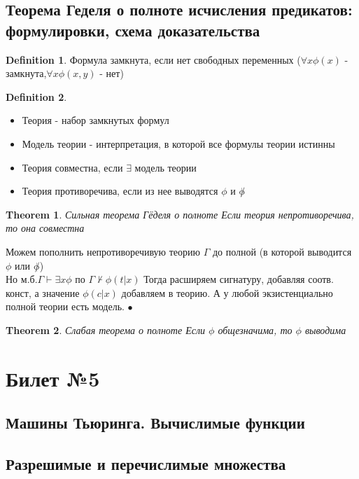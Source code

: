 \documentclass[a4paper]{article}
\theoremstyle{plain}
\newtheorem{theorem}{Theorem}
\theoremstyle{remark}
\theoremstyle{definition}
\newtheorem{definition}{Definition}
\renewenvironment{proof}{{\bfseries Proof}}{$\bullet$}
\begin{document}
\subsection{Теорема Геделя о полноте исчисления предикатов: формулировки, схема доказательства}
\begin{definition}
Формула замкнута, если нет свободных переменных ($\forall x \phi(x)$ - замкнута,$\forall x \phi(x,y)$ - нет)	
\end{definition}
\begin{definition}
	\begin{itemize}
		\item Теория - набор замкнутых формул
		\item Модель теории - интерпретация, в которой все формулы теории истинны
		\item Теория совместна, если $\exists$ модель теории 
		\item Теория противоречива, если из нее выводятся $\phi$ и $\not\phi$ 
	\end{itemize}	
\end{definition}

\begin{theorem}{Сильная теорема Гёделя о полноте}
Если теория непротиворечива, то она совместна	
\end{theorem}
\begin{proof}{Схема д-ва}
Можем пополнить непротиворечивую теорию $\Gamma$ до полной (в которой выводится $\phi$ или $\not\phi$)\\
Но м.б.$\Gamma \vdash \exists x\phi$ по $\Gamma \nvdash \phi(t|x)$
Тогда расширяем сигнатуру, добавляя соотв. конст, а значение $\phi(c|x)$ добавляем в теорию. А у любой экзистенциально полной теории есть модель.	
\end{proof}
\begin{theorem}{Слабая теорема о полноте}
Если $\phi$ общезначима, то $\phi$ выводима	
\end{theorem}
\section{Билет №5}
\subsection{Машины Тьюринга. Вычислимые функции}
\subsection{Разрешимые и перечислимые множества}
\end{document}
